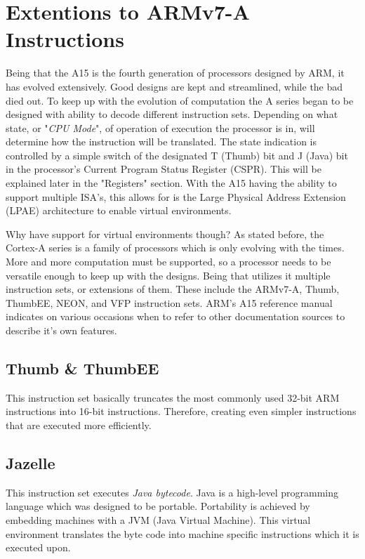 \documentclass[12pt]{scrreprt}
\begin{document}
	\section{Extentions to ARMv7-A Instructions}

	Being that the A15 is the fourth generation of processors designed by ARM, it has evolved extensively.
	Good designs are kept and streamlined, while the bad died out.
	To keep up with the evolution of computation the A series began to be designed with ability to decode different instruction sets. 
	Depending on what state, or "\textit{CPU Mode}", of operation of execution the processor is in, will determine how the instruction will be translated.
	The state indication is controlled by a simple switch of the designated T (Thumb) bit and J (Java) bit in the processor's Current Program Status Register (CSPR).
	This will be explained later in the "Registers" section.
	With the A15 having the ability to support multiple ISA's, this allows for is the Large Physical Address Extension (LPAE) architecture to enable virtual environments.

	Why have support for virtual environments though? 
	As stated before, the Cortex-A series is a family of processors which is only evolving with the times.
	More and more computation must be supported, so a processor needs to be versatile enough to keep up with the designs.
	Being that utilizes it multiple instruction sets, or extensions of them. 
	These include the ARMv7-A, Thumb, ThumbEE, NEON, and VFP instruction sets. 
	ARM's A15 reference manual indicates on various occasions when to refer to other documentation sources to describe it's own features.

		\subsection{Thumb \& ThumbEE}
			This instruction set basically truncates the most commonly used 32-bit ARM instructions into 16-bit instructions.
			Therefore, creating even simpler instructions that are executed more efficiently.

		\subsection{Jazelle}
			This instruction set executes \textit{Java bytecode}.
			Java is a high-level programming language which was designed to be portable.
			Portability is achieved by embedding machines with a JVM (Java Virtual Machine).
			This virtual environment translates the byte code into machine specific instructions which it is executed upon.
			
\end{document}
